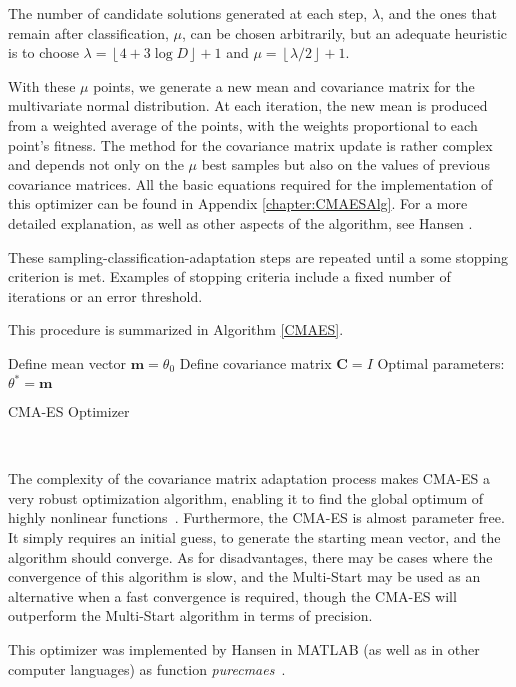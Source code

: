The number of candidate solutions generated at each step, $\lambda$, and the ones that remain after classification, $\mu$, can be chosen arbitrarily, but an adequate heuristic is to choose $\lambda=\left\lfloor4+3\log D\right\rfloor+1$ and $\mu=\left\lfloor\lambda/2\right\rfloor+1$.

With these $\mu$ points, we generate a new mean and covariance matrix for the multivariate normal distribution.
At each iteration, the new mean is produced from a weighted average of the points, with the weights proportional to each point's fitness.
The method for the covariance matrix update is rather complex and depends not only on the $\mu$ best samples but also on the values of previous covariance matrices. All the basic equations required for the implementation of this optimizer can be found in Appendix \ref{chapter:CMAESAlg}. For a more detailed explanation, as well as other aspects of the algorithm, see Hansen \cite{Hansen}.

These sampling-classification-adaptation steps are repeated until a some stopping criterion is met. Examples of stopping criteria include a fixed number of iterations or an error threshold.

This procedure is summarized in Algorithm \ref{CMAES}.

\begin{algorithm}[H]\label{CMAES}
\DontPrintSemicolon
Define mean vector $\mathbf{m}=\theta_0$
Define covariance matrix $\mathbf{C}=I$\;
 Optimal parameters: $\theta^{*}=\mathbf{m}$\;
 \caption{CMA-ES Optimizer}
\end{algorithm}
\

The complexity of the covariance matrix adaptation process makes CMA-ES a very robust optimization algorithm, enabling it to find the global optimum of highly nonlinear functions~\cite{DilaoCMA}.
Furthermore, the CMA-ES is almost parameter free. It simply requires an initial guess, to generate the starting mean vector, and the algorithm should converge.
As for disadvantages, there may be cases where the convergence of this algorithm is slow, and the Multi-Start may be used as an alternative when a fast convergence is required, though the CMA-ES will outperform the Multi-Start algorithm in terms of precision.

This optimizer was implemented by Hansen in MATLAB (as well as in other computer languages) as function \emph{purecmaes}~\cite{CMAES}.


